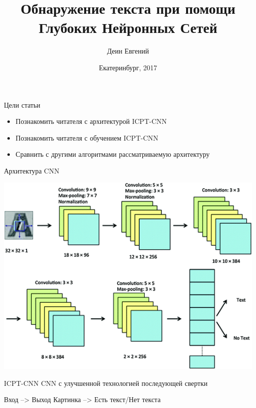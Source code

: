 \documentclass{beamer}
\begin{document}
  \title{Обнаружение текста при помощи Глубоких Нейронных Сетей}  
  \author{Деин Евгений}
  \date{Екатеринбург, 2017} 
  
  \frame{\titlepage} 
  
  \begin{frame}{Цели статьи}
    \begin{itemize}
      \item{Познакомить читателя с архитектурой ICPT-CNN}
      \item{Познакомить читателя с обучением ICPT-CNN}
      \item{Сравнить с другими алгоритмами рассматриваемую архитектуру}
    \end{itemize}
  \end{frame}

  \begin{frame}{Архитектура CNN}
    \begin{center}
      \includegraphics[scale=0.3]{cnn-architec.jpg}
    \end{center}
    \begin{block}{ICPT-CNN}
      CNN с улучшенной технологией последующей свертки
    \end{block}
    \begin{block}{Вход --> Выход}
      Картинка --> Есть текст/Нет текста
    \end{block}
  \end{frame}
\end{document}
